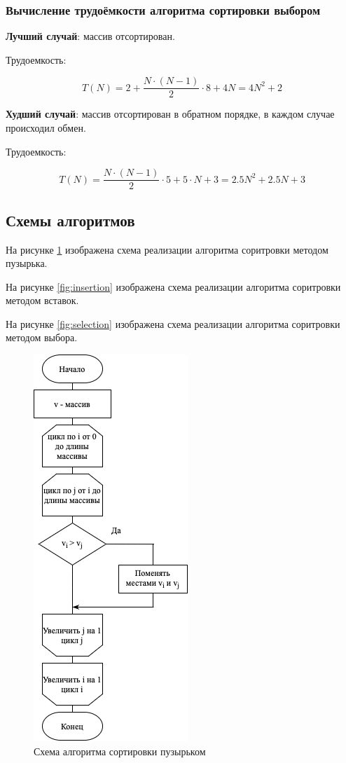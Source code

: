 \documentclass[14pt,russian]{scrartcl}
\begin{document}
\subsubsection{Вычисление трудоёмкости алгоритма сортировки выбором}

\textbf{Лучший случай}: массив отсортирован.

Трудоемкость:

\begin{equation}
    T(N) = 2 + \frac{N \cdot (N - 1)}{2} \cdot 8 + 4N = 4N^2 + 2
\end{equation}

\textbf{Худший случай}: массив отсортирован в обратном порядке, в каждом случае происходил обмен.

Трудоемкость:

\begin{equation}
    T(N) = \frac{N \cdot (N - 1)}{2} \cdot 5 + 5 \cdot N + 3 = 2.5N^2 + 2.5N + 3
\end{equation}

\subsection{Схемы алгоритмов}

На рисунке \ref{fig:bubble} изображена схема реализации алгоритма соритровки методом пузырька.

На рисунке \ref{fig:insertion} изображена схема реализации алгоритма соритровки методом вставок.

На рисунке \ref{fig:selection} изображена схема реализации алгоритма соритровки методом выбора.

\begin{figure}[h]
	\centering
	\includegraphics[scale=1]{bubble.png}
	\caption{Схема алгоритма сортировки пузырьком}
	\label{fig:bubble}
\end{figure}
\end{document}
